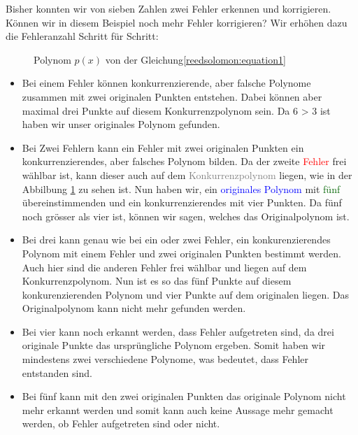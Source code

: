 \begin{beispiel}
Bisher konnten wir von sieben Zahlen zwei Fehler erkennen und korrigieren. Können wir in diesem Beispiel noch mehr Fehler korrigieren? 
Wir erhöhen dazu die Fehleranzahl Schritt für Schritt:
\begin{figure}%
	\centering
    
	\caption{Polynom $p(x)$ von der Gleichung\eqref{reedsolomon:equation1}}
	\label{fig:polynom}
\end{figure}%
\begin{itemize}
    \item[\textit{1 Fehler}:] Bei einem Fehler können konkurrenzierende, aber falsche Polynome zusammen mit zwei originalen Punkten entstehen.
        Dabei können aber maximal drei Punkte auf diesem Konkurrenzpolynom sein.
        Da 6 > 3 ist haben wir unser originales Polynom gefunden.
    \item[\textit{2 Fehler}:] Bei Zwei Fehlern kann ein Fehler mit zwei originalen Punkten ein konkurrenzierendes, aber falsches Polynom bilden.
        Da der zweite \textcolor{red}{Fehler} frei wählbar ist, kann dieser auch auf dem \textcolor{gray}{Konkurrenzpolynom} liegen, wie in der Abbilbung \ref{fig:polynom} zu sehen ist.
        Nun haben wir, ein \textcolor{blue}{originales Polynom} mit \textcolor{darkgreen}{fünf} übereinstimmenden und ein konkurrenzierendes mit vier Punkten.
        Da fünf noch grösser als vier ist, können wir sagen, welches das Originalpolynom ist.
    \item[\textit{3 Fehler}:] Bei drei kann genau wie bei ein oder zwei Fehler, ein konkurenzierendes Polynom mit einem Fehler und zwei originalen Punkten bestimmt werden.
        Auch hier sind die anderen Fehler frei wählbar und liegen auf dem Konkurrenzpolynom.
        Nun ist es so das fünf Punkte auf diesem konkurenzierenden Polynom und vier Punkte auf dem originalen liegen.
        Das Originalpolynom kann nicht mehr gefunden werden.
    \item[\textit{4 Fehler}:] Bei vier kann noch erkannt werden, dass Fehler aufgetreten sind, da drei originale Punkte das ursprüngliche Polynom ergeben.
        Somit haben wir mindestens zwei verschiedene Polynome, was bedeutet, dass Fehler entstanden sind.
    \item[\textit{5 Fehler:}] Bei fünf kann mit den zwei originalen Punkten das originale Polynom nicht mehr erkannt werden und 
        somit kann auch keine Aussage mehr gemacht werden, ob Fehler aufgetreten sind oder nicht.
\qedhere
\end{itemize}
\end{beispiel}


